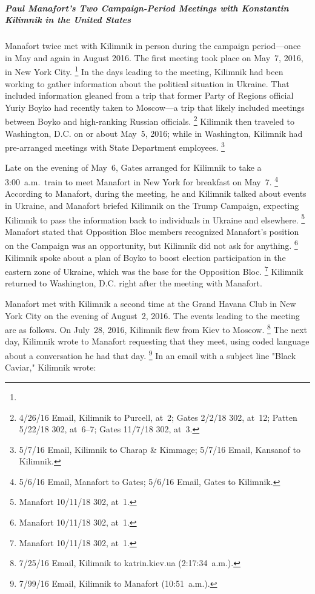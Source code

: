 \subparagraph{Paul Manafort's Two Campaign-Period Meetings with Konstantin Kilimnik in the United States}

Manafort twice met with Kilimnik in person during the campaign period---once in May and again in August 2016.
The first meeting took place on May~7, 2016, in New York City.%
\footnote{}
In the days leading to the meeting, Kilimnik had been working to gather information about the political situation in Ukraine.
That included information gleaned from a trip that former Party of Regions official Yuriy Boyko had recently taken to Moscow---a trip that likely included meetings between Boyko and high-ranking Russian officials.%
\footnote{4/26/16 Email, Kilimnik to Purcell, at~2;
Gates 2/2/18 302, at~12;
Patten 5/22/18 302, at~6--7;
Gates 11/7/18 302, at~3.}
Kilimnik then traveled to Washington, D.C. on or about May~5, 2016; while in Washington, Kilimnik had pre-arranged meetings with State Department employees.%
\footnote{5/7/16 Email, Kilimnik to Charap \& Kimmage;
5/7/16 Email, Kansanof to Kilimnik.}

Late on the evening of May~6, Gates arranged for Kilimnik to take a 3:00~a.m.\ train to meet Manafort in New York for breakfast on May~7.%
\footnote{5/6/16 Email, Manafort to Gates;
5/6/16 Email, Gates to Kilimnik.}
According to Manafort, during the meeting, he and Kilimnik talked about events in Ukraine, and Manafort briefed Kilimnik on the Trump Campaign, expecting Kilimnik to pass the information back to individuals in Ukraine and elsewhere.%
\footnote{Manafort 10/11/18 302, at~1.}
Manafort stated that Opposition Bloc members recognized Manafort's position on the Campaign was an opportunity, but Kilimnik did not ask for anything.%
\footnote{Manafort 10/11/18 302, at~1.}
Kilimnik spoke about a plan of Boyko to boost election participation in the eastern zone of Ukraine, which was the base for the Opposition Bloc.%
\footnote{Manafort 10/11/18 302, at~1.}
Kilimnik returned to Washington, D.C. right after the meeting with Manafort.

Manafort met with Kilimnik a second time at the Grand Havana Club in New York City on the evening of August~2, 2016.
The events leading to the meeting are as follows.
On July~28, 2016, Kilimnik flew from Kiev to Moscow.%
\footnote{7/25/16 Email, Kilimnik to katrin\@yana.kiev.ua (2:17:34~a.m.).}
The next day, Kilimnik wrote to Manafort requesting that they meet, using coded language about a conversation he had that day.%
\footnote{7/99/16 Email, Kilimnik to Manafort (10:51~a.m.).}
In an email with a subject line "Black Caviar," Kilimnik wrote:

